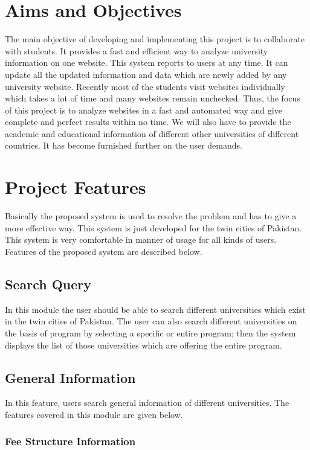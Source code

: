 \section{Aims and Objectives}

The main objective of developing and implementing this project is to collaborate with students. It provides a fast and efficient way to analyze university information on one website. This system reports to users at any time. It can update all the updated information and data which are newly added by any university website. Recently most of the students visit websites individually which takes a lot of time and many websites remain unchecked. Thus, the focus of this project is to analyze websites in a fast and automated way and give complete and perfect results within no time. We will also have to provide the academic and educational information of different other universities of different countries. It has become furnished further on the user demands.

\section{Project Features}

Basically the proposed system is used to resolve the problem and has to give a more effective way. This system is just developed for the twin cities of Pakistan. This system is very comfortable in manner of usage for all kinds of users. Features of the proposed system are described below.

\subsection{Search Query}

In this module the user should be able to search different universities which exist in the twin cities of Pakistan. The user can also search different universities on the basis of program by selecting a specific or entire program; then the system displays the list of those universities which are offering the entire program.

\subsection{General Information}

In this feature, users search general information of different universities. The features covered in this module are given below.

\subsubsection{Fee Structure Information}

